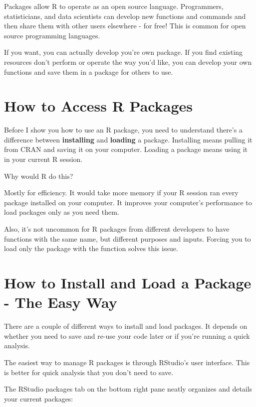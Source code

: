 \documentclass[
]{book}
\begin{document}
\begin{center}
Packages allow R to operate as an open source language. Programmers, statisticians, and data scientists can develop new functions and commands and then share them with other users elsewhere - for free! This is common for open source programming languages.

If you want, you can actually develop you're own package. If you find existing resources don't perform or operate the way you'd like, you can develop your own functions and save them in a package for others to use.

\hypertarget{how-to-access-r-packages}{%
\section{How to Access R Packages}\label{how-to-access-r-packages}}

Before I show you how to use an R package, you need to understand there's a difference between \textbf{installing} and \textbf{loading} a package. Installing means pulling it from CRAN and saving it on your computer. Loading a package means using it in your current R session.

Why would R do this?

Mostly for efficiency. It would take more memory if your R session ran every package installed on your computer. It improves your computer's performance to load packages only as you need them.

Also, it's not uncommon for R packages from different developers to have functions with the same name, but different purposes and inputs. Forcing you to load only the package with the function solves this issue.

\hypertarget{how-to-install-and-load-a-package---the-easy-way}{%
\section{How to Install and Load a Package - The Easy Way}\label{how-to-install-and-load-a-package---the-easy-way}}

There are a couple of different ways to install and load packages. It depends on whether you need to save and re-use your code later or if you're running a quick analysis.

The easiest way to manage R packages is through RStudio's user interface. This is better for quick analysis that you don't need to save.

The RStudio packages tab on the bottom right pane neatly organizes and details your current packages:


\end{center}
\end{document}

